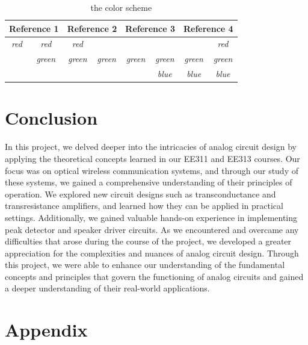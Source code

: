 \documentclass[a4paper,10pt]{IEEEtran}
\begin{document}
\begin{table}[]
    \caption{the color scheme}
    \label{tab:array}
    \begin{tabular}{|cc|cc|cc|cc|}
    \hline
    \multicolumn{2}{|c|}{\textbf{Reference 1}}          & \multicolumn{2}{c|}{\textbf{Reference 2}}            & \multicolumn{2}{c|}{\textbf{Reference 3}}            & \multicolumn{2}{c|}{\textbf{Reference 4}}            \\ \hline
    \multicolumn{1}{|c|}{\textit{red}} & \textit{red}   & \multicolumn{1}{c|}{\textit{red}}   & \textit{}      & \multicolumn{1}{c|}{\textit{}}      & \textit{}      & \multicolumn{1}{c|}{\textit{}}      & \textit{red}   \\ \hline
    \multicolumn{1}{|c|}{\textit{}}    & \textit{green} & \multicolumn{1}{c|}{\textit{green}} & \textit{green} & \multicolumn{1}{c|}{\textit{green}} & \textit{green} & \multicolumn{1}{c|}{\textit{green}} & \textit{green} \\ \hline
    \multicolumn{1}{|c|}{\textit{}}    & \textit{}      & \multicolumn{1}{c|}{\textit{}}      & \textit{}      & \multicolumn{1}{c|}{\textit{}}      & \textit{blue}  & \multicolumn{1}{c|}{\textit{blue}}  & \textit{blue}  \\ \hline
    \end{tabular}
    \end{table}
\section{Conclusion}
In this project, we delved deeper into the intricacies of analog circuit design by applying the theoretical concepts learned in our EE311 and EE313 courses. Our focus was on optical wireless communication systems, and through our study of these systems, we gained a comprehensive understanding of their principles of operation. We explored new circuit designs such as transconductance and transresistance amplifiers, and learned how they can be applied in practical settings. Additionally, we gained valuable hands-on experience in implementing peak detector and speaker driver circuits. As we encountered and overcame any difficulties that arose during the course of the project, we developed a greater appreciation for the complexities and nuances of analog circuit design. Through this project, we were able to enhance our understanding of the fundamental concepts and principles that govern the functioning of analog circuits and gained a deeper understanding of their real-world applications.
\section*{Appendix}
\end{document}
